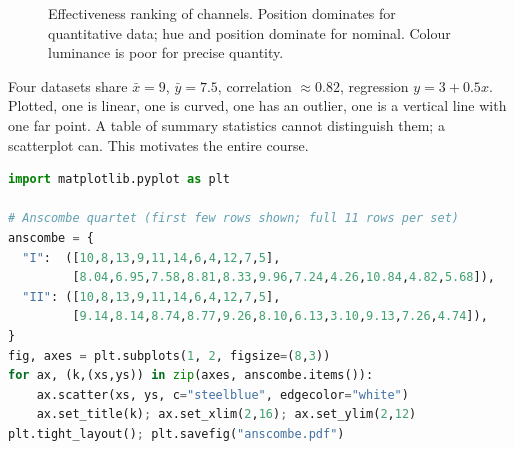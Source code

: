 \begin{figure}[h]\centering
{}
\caption{Effectiveness ranking of channels. Position dominates for quantitative data; hue and position dominate for nominal. Colour luminance is poor for precise quantity.}
\label{fig:mackinlay}
\end{figure}

\begin{example}\label{ex:anscombe}
Four datasets share $\bar{x}=9$, $\bar{y}=7.5$, correlation $\approx0.82$, regression $y=3+0.5x$. Plotted, one is linear, one is curved, one has an outlier, one is a vertical line with one far point. A table of summary statistics cannot distinguish them; a scatterplot can. This motivates the entire course.
\end{example}

\begin{lstlisting}[language=Python, caption={Anscombe's quartet: same stats, four pictures.}, label={lst:anscombe}]
import matplotlib.pyplot as plt

# Anscombe quartet (first few rows shown; full 11 rows per set)
anscombe = {
  "I":  ([10,8,13,9,11,14,6,4,12,7,5],
         [8.04,6.95,7.58,8.81,8.33,9.96,7.24,4.26,10.84,4.82,5.68]),
  "II": ([10,8,13,9,11,14,6,4,12,7,5],
         [9.14,8.14,8.74,8.77,9.26,8.10,6.13,3.10,9.13,7.26,4.74]),
}
fig, axes = plt.subplots(1, 2, figsize=(8,3))
for ax, (k,(xs,ys)) in zip(axes, anscombe.items()):
    ax.scatter(xs, ys, c="steelblue", edgecolor="white")
    ax.set_title(k); ax.set_xlim(2,16); ax.set_ylim(2,12)
plt.tight_layout(); plt.savefig("anscombe.pdf")
\end{lstlisting}

